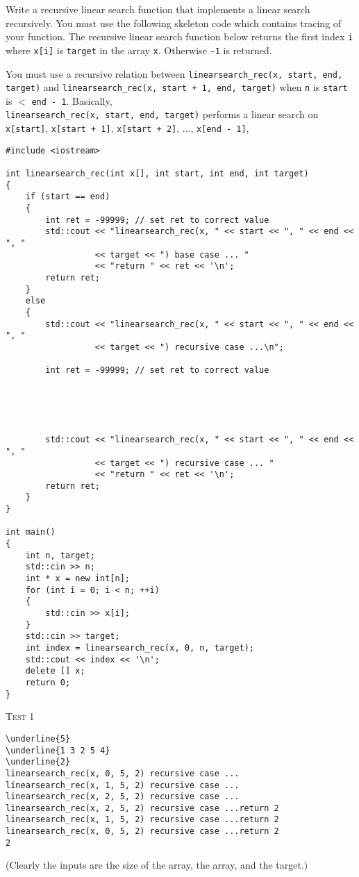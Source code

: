 Write a recursive linear search function that implements
a linear search recursively.
You must use the following skeleton code which
contains tracing of your function.
The recursive linear search function below returns
the first index \verb!i! where \verb!x[i]! is \verb!target!
in the array \verb!x!.
Otherwise \verb!-1! is returned.

You must use a recursive relation between
\verb!linearsearch_rec(x, start, end, target)!
and
\verb!linearsearch_rec(x, start + 1, end, target)!
when \verb!n! is \verb!start! is $<$ \verb!end - 1!.
Basically,
\\
\verb!linearsearch_rec(x, start, end, target)!
performs a linear search on
\\
\verb!x[start]!,
\verb!x[start + 1]!,
\verb!x[start + 2]!, ...,
\verb!x[end - 1]!,

\begin{Verbatim}[frame=single, fontsize=\small,commandchars=\~\!\@]
#include <iostream>

int linearsearch_rec(int x[], int start, int end, int target)
{
    if (start == end)
    {
        int ret = -99999; // set ret to correct value
        std::cout << "linearsearch_rec(x, " << start << ", " << end << ", "
                  << target << ") base case ... "
                  << "return " << ret << '\n';
        return ret;
    }
    else
    {
        std::cout << "linearsearch_rec(x, " << start << ", " << end << ", "
                  << target << ") recursive case ...\n";

        int ret = -99999; // set ret to correct value





        std::cout << "linearsearch_rec(x, " << start << ", " << end << ", "
                  << target << ") recursive case ... "
                  << "return " << ret << '\n';
        return ret;        
    }
}

int main()
{
    int n, target;
    std::cin >> n;
    int * x = new int[n];
    for (int i = 0; i < n; ++i)
    {
        std::cin >> x[i];
    }
    std::cin >> target;
    int index = linearsearch_rec(x, 0, n, target);
    std::cout << index << '\n';
    delete [] x;
    return 0;
}
\end{Verbatim}

\textsc{Test 1}
\begin{Verbatim}[commandchars=\\\{\}, fontsize=\small, frame=single]
\underline{5}
\underline{1 3 2 5 4}
\underline{2}
linearsearch_rec(x, 0, 5, 2) recursive case ...
linearsearch_rec(x, 1, 5, 2) recursive case ...
linearsearch_rec(x, 2, 5, 2) recursive case ...
linearsearch_rec(x, 2, 5, 2) recursive case ...return 2
linearsearch_rec(x, 1, 5, 2) recursive case ...return 2
linearsearch_rec(x, 0, 5, 2) recursive case ...return 2
2
\end{Verbatim}
(Clearly the inputs are the size of the array, the array, and the target.)

